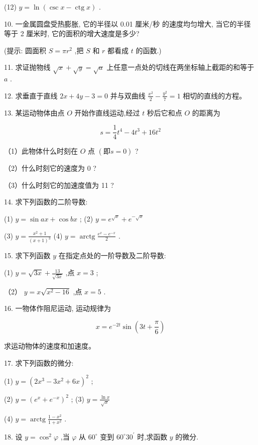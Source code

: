 \documentclass[lang=cn,newtx,12pt,scheme=chinese]{elegantbook}
\begin{document}
(12) \(y = \ln \left( {\csc x - \operatorname{ctg}x}\right)\) .

10. 一金属圆盘受热膨胀, 它的半径以 0.01 厘米/秒 的速度均匀增大, 当它的半径等于 2 厘米时, 它的面积的增大速度是多少?

(提示: 圆面积 \(S = \pi {r}^{2}\) ,把 \(S\) 和 \(r\) 都看成 \(t\) 的函数.)

11. 求证抛物线 \(\sqrt{x} + \sqrt{y} = \sqrt{a}\) 上任意一点处的切线在两坐标轴上截距的和等于 \(a\) .

12. 求垂直于直线 \({2x} + {4y} - 3 = 0\) 并与双曲线 \(\frac{{x}^{2}}{2} - \frac{{y}^{2}}{7} = 1\) 相切的直线的方程。

13. 某运动物体由点 \(O\) 开始作直线运动,经过 \(t\) 秒后它和点 \(O\) 的距离为

\[
s = \frac{1}{4}{t}^{4} - 4{t}^{3} + {16}{t}^{2}
\]

（1）此物体什么时刻在 \(O\) 点 \(\left( {\text{即}s = 0}\right)\) ?

（2）什么时刻它的速度为 0 ?

（3）什么时刻它的加速度值为 11 ?

14. 求下列函数的二阶导数:

(1) \(y = \sin {ax} + \cos {bx}\) ; (2) \(y = {e}^{\sqrt{x}} + {e}^{-\sqrt{x}}\)

(3) \(y = \frac{{x}^{2} + 1}{{\left( x + 1\right) }^{3}}\) (4) \(y = \operatorname{arctg}\frac{{e}^{x} - {e}^{-x}}{2}\) .

15. 求下列函数 \(y\) 在指定点处的一阶导数及二阶导数:

(1) \(y = \sqrt{3x} + \frac{13}{\sqrt{3x}}\) ,点 \(x = 3\) ;

（2） \(y = x\sqrt{{x}^{2} - {16}}\) ,点 \(x = 5\) .

16. 一物体作阻尼运动, 运动规律为

\[
x = {e}^{-{2t}}\sin \left( {{3t} + \frac{\pi }{6}}\right)
\]

求运动物体的速度和加速度。

17. 求下列函数的微分:

(1) \(y = {\left( 2{x}^{3} - 3{x}^{2} + 6x\right) }^{2}\) ;

(2) \(y = {\left( {e}^{x} + {e}^{-x}\right) }^{2}\) ; (3) \(y = \frac{\ln x}{\sqrt{x}}\)

(4) \(y = \operatorname{arctg}\frac{1 - {x}^{2}}{1 + {x}^{2}}\) .

18. 设 \(y = {\cos }^{2}\varphi\) ,当 \(\varphi\) 从 \({60}^{ \circ }\) 变到 \({60}^{ \circ }{30}^{\prime }\) 时,求函数 \(y\) 的微分.
\end{document}
